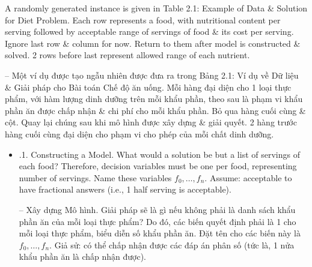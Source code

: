 \documentclass{article}
\begin{document}
\begin{itemize}
\begin{itemize}
        A randomly generated instance is given in {\sf Table 2.1: Example of Data \& Solution for Diet Problem}. Each row represents a food, with nutritional content per serving followed by acceptable range of servings of food \& its cost per serving. Ignore last row \& column for now. Return to them after model is constructed \& solved. 2 rows before last represent allowed range of each nutrient.

        -- Một ví dụ được tạo ngẫu nhiên được đưa ra trong {\sf Bảng 2.1: Ví dụ về Dữ liệu \& Giải pháp cho Bài toán Chế độ ăn uống}. Mỗi hàng đại diện cho 1 loại thực phẩm, với hàm lượng dinh dưỡng trên mỗi khẩu phần, theo sau là phạm vi khẩu phần ăn được chấp nhận \& chi phí cho mỗi khẩu phần. Bỏ qua hàng cuối cùng \& cột. Quay lại chúng sau khi mô hình được xây dựng \& giải quyết. 2 hàng trước hàng cuối cùng đại diện cho phạm vi cho phép của mỗi chất dinh dưỡng.
        \begin{itemize}
            \item {.1. Constructing a Model.} What would a solution be but a list of servings of each food? Therefore, decision variables must be one per food, representing number of servings. Name these variables $f_0,\ldots,f_n$. Assume: acceptable to have fractional answers (i.e., 1 half serving is acceptable).

            -- {\sf Xây dựng Mô hình.} Giải pháp sẽ là gì nếu không phải là danh sách khẩu phần ăn của mỗi loại thực phẩm? Do đó, các biến quyết định phải là 1 cho mỗi loại thực phẩm, biểu diễn số khẩu phần ăn. Đặt tên cho các biến này là $f_0,\ldots,f_n$. Giả sử: có thể chấp nhận được các đáp án phân số (tức là, 1 nửa khẩu phần ăn là chấp nhận được).


\end{itemize}
\end{itemize}
\end{itemize}
\end{document}
